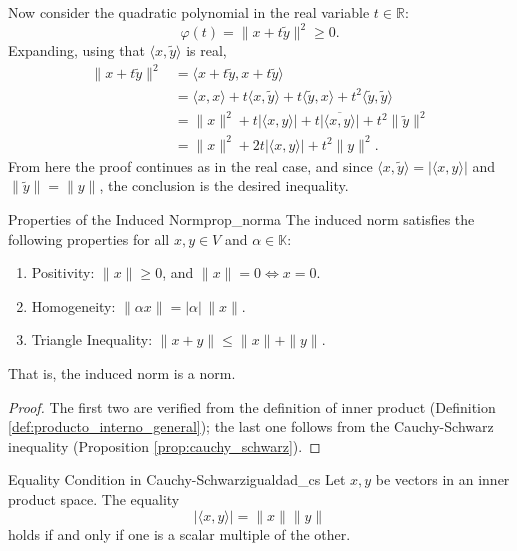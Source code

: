 \documentclass[11pt, a4paper]{article}
\begin{document}
Now consider the quadratic polynomial in the real variable $t \in \mathbb{R}$:
\[
\varphi(t) = \| x + t\tilde{y} \|^2 \ge 0.
\]
Expanding, using that $\langle x, \tilde{y} \rangle$ is real,
\begin{align*}
\| x + t\tilde{y} \|^2 &= \langle x + t\tilde{y}, x + t\tilde{y} \rangle \\
&= \langle x, x \rangle + t \langle x, \tilde{y} \rangle + t \langle \tilde{y}, x \rangle + t^2 \langle \tilde{y}, \tilde{y} \rangle \\
&= \|x\|^2 + t |\langle x, y \rangle| + t \overline{|\langle x, y \rangle|} + t^2 \|\tilde{y}\|^2 \\
&= \|x\|^2 + 2t |\langle x, y \rangle| + t^2 \|y\|^2.
\end{align*}
From here the proof continues as in the real case, and since $\langle x, \tilde{y} \rangle = |\langle x, y \rangle|$ and $\|\tilde{y}\| = \|y\|$, the conclusion is the desired inequality.

\begin{proposicion}{Properties of the Induced Norm}{prop_norma}
The induced norm satisfies the following properties for all $x, y \in V$ and $\alpha \in \mathbb{K}$:
\begin{enumerate}
    \item Positivity: $\|x\| \ge 0$, and $\|x\|=0 \iff x=0$.
    \item Homogeneity: $\|\alpha x\| = |\alpha|\,\|x\|$.
    \item Triangle Inequality: $\|x+y\| \le \|x\| + \|y\|$.
\end{enumerate}
That is, the induced norm is a norm.
\end{proposicion}

\begin{proof}
The first two are verified from the definition of inner product (Definition \ref{def:producto_interno_general}); the last one follows from the Cauchy-Schwarz inequality (Proposition \ref{prop:cauchy_schwarz}).
\end{proof}

\begin{proposicion}{Equality Condition in Cauchy-Schwarz}{igualdad_cs}
Let $x, y$ be vectors in an inner product space. The equality
\[
|\langle x, y \rangle| = \|x\| \|y\|
\]
holds if and only if one is a scalar multiple of the other.
\end{proposicion}
\end{document}
